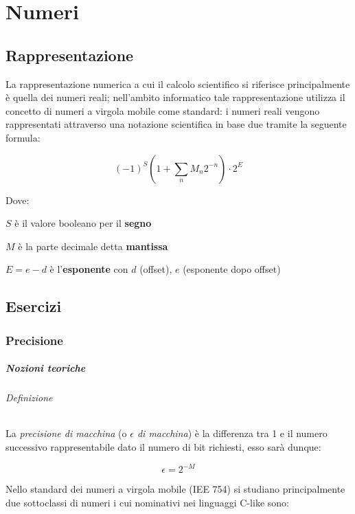 \setchapterpreamble[u]{\margintoc}
\chapter{Numeri}

\section{Rappresentazione}

La rappresentazione numerica a cui il calcolo scientifico si riferisce principalmente
è quella dei numeri reali; nell’ambito informatico tale rappresentazione utilizza
il concetto di numeri a virgola mobile come standard: i numeri reali vengono
rappresentati attraverso una notazione scientifica in base due tramite la seguente formula:

$$
	(-1)^S \left( 1 + \sum_n M_n 2^{-n} \right) \cdot 2^{E}
$$

Dove:
\begin{description}
	\item $S$ è il valore booleano per il \textbf{segno}
	\item $M$ è la parte decimale detta \textbf{mantissa}

	\item $E = e - d$ è l'\textbf{esponente} con $d$ (offset), $e$ (esponente dopo offset)
\end{description}

\section{Esercizi}

\subsection{Precisione}

\paragraph{Nozioni teoriche}

\subparagraph{Definizione} La \textit{precisione di macchina} (o \textit{$\epsilon$ di macchina})
è la differenza tra 1 e il numero successivo rappresentabile dato il numero di bit
richiesti, esso sarà dunque:

$$
	\epsilon = 2^{-M}
$$

Nello standard dei numeri a virgola mobile (IEE 754) si studiano principalmente
due sottoclassi di numeri i cui nominativi nei linguaggi C-like sono:


